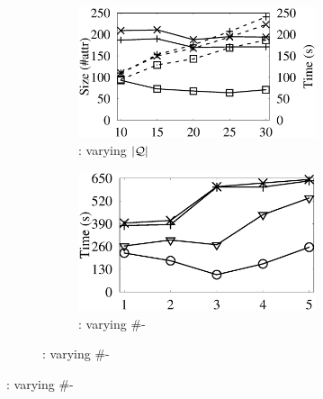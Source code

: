 \begin{figure}[tb!]
\begin{subfigure}[b]{1.00\textwidth}
        \begin{subfigure}[b]{0.271\textwidth}
			\centering
			\includegraphics[width=1\textwidth]{fig/vary_q_tpcds.eps}
			\begin{center}
				\vspace{-2ex}\caption{\tpcds: varying $|\mathcal Q|$}
				\label{tpcds-1-varyQ}
			\end{center}
			\vspace{-1ex}
        \end{subfigure}
        \hspace{-3ex}
        \begin{subfigure}[b]{0.256\textwidth}
          \centering
          \includegraphics[width=1\textwidth]{fig/vary_j_tpch.eps}
          \begin{center}
            \vspace{-2ex}\caption{\tpcds: varying \#-}
            \label{tpcds-1-vary-join}
          \end{center}
          \vspace{-1ex}
        \end{subfigure}
         \hspace{-2.8ex}

\end{subfigure}
\end{figure}
